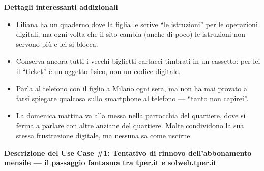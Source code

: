 \documentclass[11pt,a4paper]{article}
\begin{document}
\vspace{0.3cm}


\begin{tcolorbox}[colback=backgroundColor!50,colframe=borderColor,arc=2mm]
    \textbf{Dettagli interessanti addizionali} \\[4pt]
    {\small
    \begin{itemize}[leftmargin=*]
        \item Liliana ha un quaderno dove la figlia le scrive ``le istruzioni'' per le operazioni digitali, ma ogni volta che il sito cambia (anche di poco) le istruzioni non servono più e lei si blocca.
        \item Conserva ancora tutti i vecchi biglietti cartacei timbrati in un cassetto: per lei il ``ticket'' è un oggetto fisico, non un codice digitale.
        \item Parla al telefono con il figlio a Milano ogni sera, ma non ha mai provato a farsi spiegare qualcosa sullo smartphone al telefono --- ``tanto non capirei''.
        \item La domenica mattina va alla messa nella parrocchia del quartiere, dove si ferma a parlare con altre anziane del quartiere. Molte condividono la sua stessa frustrazione digitale, ma nessuna sa come uscirne.
    \end{itemize}
    }
\end{tcolorbox}

\newpage


\begin{tcolorbox}[colback=primaryColor!10,colframe=primaryColor,arc=2mm]
    \textbf{Descrizione del Use Case \#1: Tentativo di rinnovo dell'abbonamento mensile --- il passaggio fantasma tra tper.it e solweb.tper.it}
\end{tcolorbox}

\vspace{0.3cm}
\end{document}
